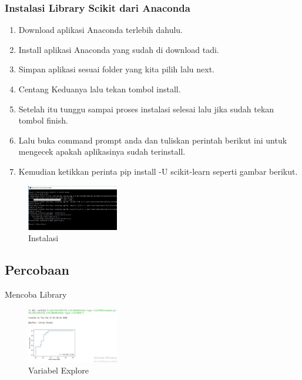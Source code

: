 \subsubsection{Instalasi Library Scikit dari Anaconda}
\begin{enumerate}
\item Download aplikasi Anaconda terlebih dahulu. 
\item Install aplikasi Anaconda yang sudah di download tadi. 
\item Simpan aplikasi sesuai folder yang kita pilih lalu next. 
\item Centang Keduanya lalu tekan tombol install. 
\item Setelah itu tunggu sampai proses instalasi selesai lalu jika sudah tekan tombol finish. 
\item Lalu buka command prompt anda dan tuliskan perintah berikut ini untuk mengecek apakah aplikasinya sudah terinstall. 
\item Kemudian ketikkan perinta pip install -U scikit-learn seperti gambar berikut. 
\end{enumerate}
         \begin{figure}[H]
                \includegraphics[width=4cm]{figures/1174034/chapter1/install1.png}
                \centering
                \caption{Instalasi}
            \end{figure}

\subsection{Percobaan}
Mencoba Library

 			\begin{figure}[H]
                \includegraphics[width=4cm]{figures/1174034/chapter1/example1.png}
                \centering
                \caption{Variabel Explore}
            \end{figure}


